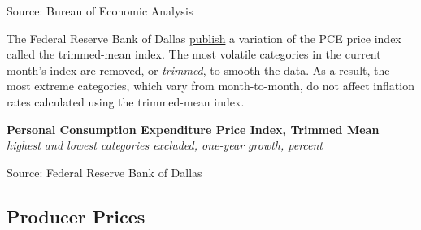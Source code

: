 \documentclass{report}
\makeatletter
\newcommand{\tbllink}[1]{\href{https://raw.githubusercontent.com/bdecon/US-chartbook/master/chartbook/data/#1}{\faTable}}
\newcommand*\short[1]{\expandafter\@gobbletwo\number\numexpr#1\relax}
\newcommand{\dateaxisticks}{
		date coordinates in=x, axis line style={draw=none},
		xmax={2023-02-15},
		max space between ticks=40,	    
		xtick={{1990-01-01}, {1992-01-01}, {1994-01-01}, 
			{1996-01-01}, {1998-01-01}, {2000-01-01}, 
			{2002-01-01}, {2004-01-01}, {2006-01-01},
			{2008-01-01}, {2010-01-01}, {2012-01-01}, {2014-01-01},
		    {2016-01-01}, {2018-01-01}, {2020-01-01}, {2022-01-01}, 
		    {2024-01-01}, {2026-01-01}},
		minor xtick={{1989-01-01}, {1991-01-01}, {1993-01-01},
			{1995-01-01}, {1997-01-01}, {1999-01-01}, 
			{2001-01-01}, {2003-01-01}, {2005-01-01}, {2007-01-01},
		    {2009-01-01}, {2011-01-01}, {2013-01-01}, {2015-01-01},
		    {2017-01-01}, {2019-01-01}, {2021-01-01}, {2023-01-01}, 
		    {2025-01-01}, {2027-01-01}},
		enlarge y limits={0.06}, enlarge x limits={0.01},
		}
\newcommand{\bbar}[2]{extra #1 ticks = {{#2}}, extra #1 tick labels = ,
		extra #1 tick style = {grid=major, grid style={thick, black!25}},}
\newcommand{\stdline}[4]{\addplot[very thick, no markers, color=#1] 
		table [x=#2, y=#3, col sep=comma] {#4};	}
\newcommand{\rbars}{
		\fill[color=black!10] (axis cs:{1990-07-01},\pgfkeysvalueof{/pgfplots/ymin}) rectangle 
			(axis cs:{1991-03-01}, \pgfkeysvalueof{/pgfplots/ymax});
		\fill[color=black!10] (axis cs:{2007-12-01},\pgfkeysvalueof{/pgfplots/ymin}) rectangle 
			(axis cs:{2009-07-01}, \pgfkeysvalueof{/pgfplots/ymax});
		\fill[color=black!10] (axis cs:{2001-03-01},\pgfkeysvalueof{/pgfplots/ymin}) rectangle 
			(axis cs:{2001-11-01}, \pgfkeysvalueof{/pgfplots/ymax});
		\fill[color=black!10] (axis cs:{2020-02-01},\pgfkeysvalueof{/pgfplots/ymin}) rectangle 
			(axis cs:{2020-05-01}, \pgfkeysvalueof{/pgfplots/ymax});}
\makeatother
\begin{document}
{\begin{minipage}{0.76\textwidth}
\hspace{3mm} 

\footnotesize{Source: Bureau of Economic Analysis} \hfill \tbllink{pce_pi.csv}
\vspace{5mm}

\small The Federal Reserve Bank of Dallas \href{https://www.dallasfed.org/research/pce}{publish} a variation of the PCE price index called the trimmed-mean index. The most volatile categories in the current month's index are removed, or \textit{trimmed}, to smooth the data. As a result, the most extreme categories, which vary from month-to-month, do not affect inflation rates calculated using the trimmed-mean index. 


\vspace{1mm}

\normalsize \textbf{Personal Consumption Expenditure Price Index, Trimmed Mean}\\
\footnotesize{\textit{highest and lowest categories excluded, one-year growth, percent}}\\
\vspace{26mm}

\hspace{3mm} 

\footnotesize{Source: Federal Reserve Bank of Dallas} \hfill \tbllink{pce_tm12.csv}
\end{minipage} 
\newpage
\begin{minipage}{0.76\textwidth}
\hypertarget{prp}{}
\subsection*{Producer Prices}


\end{minipage}}
\end{document}
